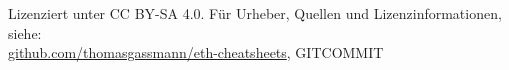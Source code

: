 
\begin{center}
    Lizenziert unter CC BY-SA 4.0. Für Urheber, Quellen und Lizenzinformationen, siehe:\\
    \href{https://github.com/thomasgassmann/eth-cheatsheets}{github.com/thomasgassmann/eth-cheatsheets}, GITCOMMIT
\end{center}
